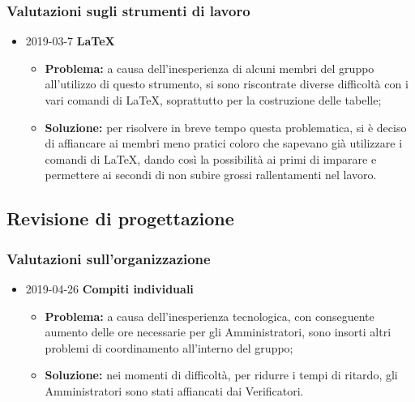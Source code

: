\subsubsection{Valutazioni sugli strumenti di lavoro}
\begin{itemize}
				
		\item 2019-03-7 \textbf{\LaTeX{}} \\
		\begin{itemize}
			\item \textbf{Problema:} a causa dell'inesperienza di alcuni membri del gruppo all'utilizzo di questo strumento, si sono riscontrate diverse difficoltà con i vari comandi di \LaTeX{}, soprattutto per la costruzione delle tabelle;
			\item \textbf{Soluzione:} per risolvere in breve tempo questa problematica, si è deciso di affiancare
		ai membri meno pratici coloro che sapevano già utilizzare i comandi di \LaTeX{}, dando
		così la possibilità ai primi di imparare e permettere ai secondi di non 
		subire grossi rallentamenti nel lavoro.
		\end{itemize}		
		
\end{itemize}
\newpage
\subsection{Revisione di progettazione}

\subsubsection{Valutazioni sull'organizzazione}
\begin{itemize}	
		\item 2019-04-26 \textbf{Compiti individuali} \\
		\begin{itemize}
			\item \textbf{Problema:} a causa dell'inesperienza tecnologica, con conseguente aumento delle ore necessarie per gli Amministratori, sono insorti altri problemi di coordinamento all'interno del gruppo;
			\item \textbf{Soluzione:} nei momenti di difficoltà, per ridurre i tempi di ritardo, gli Amministratori sono stati affiancati dai Verificatori.
		\end{itemize}
	
\end{itemize}

